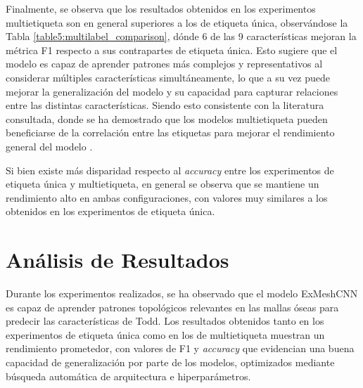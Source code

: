 Finalmente, se observa que los resultados obtenidos en los experimentos multietiqueta son en general superiores a los de etiqueta única, observándose la Tabla \ref{table5:multilabel_comparison}, dónde 6 de las 9 características mejoran la métrica F1 respecto a sus contrapartes de etiqueta única. Esto sugiere que el modelo es capaz de aprender patrones más complejos y representativos al considerar múltiples características simultáneamente, lo que a su vez puede mejorar la generalización del modelo y su capacidad para capturar relaciones entre las distintas características. Siendo esto consistente con la literatura consultada, donde se ha demostrado que los modelos multietiqueta pueden beneficiarse de la correlación entre las etiquetas para mejorar el rendimiento general del modelo \cite{ranjan_hyperface_2019}.

Si bien existe más disparidad respecto al \textit{accuracy} entre los experimentos de etiqueta única y multietiqueta, en general se observa que se mantiene un rendimiento alto en ambas configuraciones, con valores muy similares a los obtenidos en los experimentos de etiqueta única.

\section{Análisis de Resultados}
Durante los experimentos realizados, se ha observado que el modelo ExMeshCNN es capaz de aprender patrones topológicos relevantes en las mallas óseas para predecir las características de Todd. Los resultados obtenidos tanto en los experimentos de etiqueta única como en los de multietiqueta muestran un rendimiento prometedor, con valores de F1 y \textit{accuracy} que evidencian una buena capacidad de generalización por parte de los modelos, optimizados mediante búsqueda automática de arquitectura e hiperparámetros.

